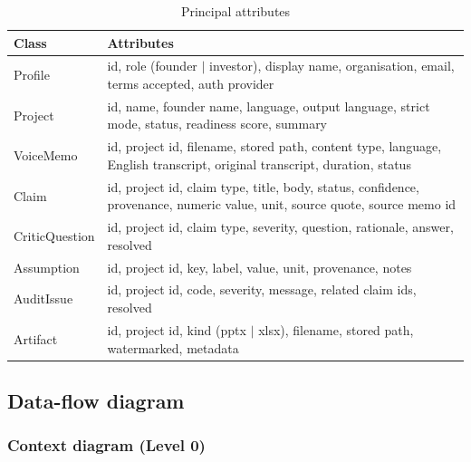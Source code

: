 \documentclass[11pt,a4paper]{article}
\begin{document}
\begin{table}[ht]
\centering
\caption{Principal attributes}
\label{tab:classattrs}
\small
\begin{tabularx}{\textwidth}{@{}l X@{}}
\toprule
\textbf{Class} & \textbf{Attributes} \\
\midrule
Profile & id, role (founder $\mid$ investor), display name, organisation, email, terms accepted, auth provider \\
Project & id, name, founder name, language, output language, strict mode, status, readiness score, summary \\
VoiceMemo & id, project id, filename, stored path, content type, language, English transcript, original transcript, duration, status \\
Claim & id, project id, claim type, title, body, status, confidence, provenance, numeric value, unit, source quote, source memo id \\
CriticQuestion & id, project id, claim type, severity, question, rationale, answer, resolved \\
Assumption & id, project id, key, label, value, unit, provenance, notes \\
AuditIssue & id, project id, code, severity, message, related claim ids, resolved \\
Artifact & id, project id, kind (pptx $\mid$ xlsx), filename, stored path, watermarked, metadata \\
\bottomrule
\end{tabularx}
\end{table}

\subsection{Data-flow diagram}

\subsubsection{Context diagram (Level 0)}
\end{document}
